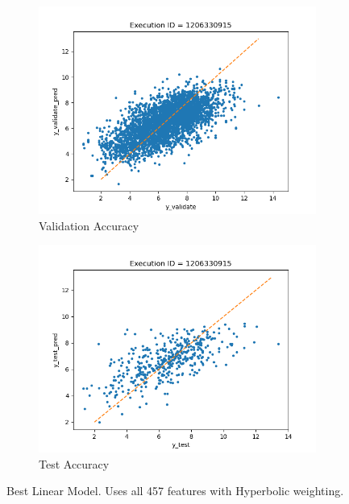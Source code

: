 \documentclass[11pt]{article}
\begin{document}

\begin{figure}
     \centering
     \begin{subfigure}[b]{0.45\textwidth}
         \centering
         \includegraphics[scale=0.45]{images/accuracyValidateLGHyperbolic}
         \caption{Validation Accuracy}
        \label{fig:accuracyValidateLGHyperbolic}
     \end{subfigure}
     \hfill
     \begin{subfigure}[b]{0.45\textwidth}
         \centering
         \includegraphics[scale=0.45]{images/accuracytestLGHyperbolic}
        \caption{Test Accuracy}
        \label{fig:accuracytestLGHyperbolic}
     \end{subfigure}
     \caption{Best Linear Model.  Uses all 457 features with Hyperbolic weighting.}
     \label{fig:BestLinearModel}
\end{figure}
\end{document}
